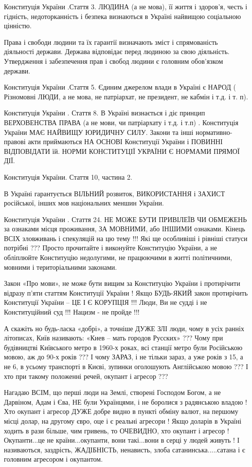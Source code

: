 \begin{itemize}
\begin{itemize}
Конституція України .Стаття 3. ЛЮДИНА (а не мова), її життя і здоров'я, честь і
гідність, недоторканність і безпека визнаються в Україні найвищою соціальною
цінністю.

Права і свободи людини та їх гарантії визначають зміст і спрямованість
діяльності держави. Держава відповідає перед людиною за свою діяльність.
Утвердження і забезпечення прав і свобод людини є головним обов'язком держави.

Конституція України .Стаття 5. Єдиним джерелом влади в Україні є НАРОД (
Різномовні ЛЮДИ, а не мова, не патріархат, не президент, не кабмін і т.д. і т.
п).

Конституція України . Стаття 8. В Україні визнається і діє принцип ВЕРХОВЕНСТВА
ПРАВА (а не мови, чи патріархату і т.д. і т.п) . Конституція України МАЄ
НАЙВИЩУ ЮРИДИЧНУ СИЛУ. Закони та інші нормативно-правові акти приймаються НА
ОСНОВІ Конституції України і ПОВИННІ ВІДПОВІДАТИ їй. НОРМИ КОНСТИТУЦІЇ УКРАЇНИ
Є НОРМАМИ ПРЯМОЇ ДІЇ.

Конституція України. Стаття 10, частина 2.

В Україні гарантується ВІЛЬНИЙ розвиток, ВИКОРИСТАННЯ і ЗАХИСТ російської,
інших мов національних меншин України.

Конституція України . Стаття 24. НЕ МОЖЕ БУТИ ПРИВІЛЕЇВ ЧИ ОБМЕЖЕНЬ за ознаками
місця проживання, ЗА МОВНИМИ, або ІНШИМИ ознаками. Кінець ВСІХ зловживань і
спекуляцій на цю тему !!! Які ще особливіші і рівніші статуси потрібні ???
Просто прочитайте і виконуйте Конституцію України, а не обліплюйте Конституцію
недолугими, не працюючими в житті політичними, мовними і територіальними
законами.

Закон «Про мови», не може бути вищим за Конституцію України і протирічити
відразу п’яти статтям Конституції України ! Якщо БУДЬ-ЯКИЙ закон протирічить
Конституції України – ЦЕ І Є КОРУПЦІЯ !!! Люди, Ви не судді і не Конституційний
суд !!! Нацизм - не пройде !!!

А скажіть но будь-ласка «добрі», а точніше ДУЖЕ ЗЛІ люди, чому в усіх ранніх
літописах, Київ називають: «Киев – мать городов Русских» ??? Чому при
будівництві Київського метро в 1960-х роках, всі станції метро були Російською
мовою, аж до 90-х років ??? І чому ЗАРАЗ, і не тільки зараз, а уже років з 15,
а не 6, в усьому транспорті в Києві, зупинки оголошують Англійською мовою ??? І
хто при такому положенні речей, окупант і агресор ??? 


Нагадаю ВСІМ, що перші люди на Землі, створені Господом Богом, а не Дарвіном,
Адам і Єва, НЕ були Українцями, і не боролися з радянською владою ! Хто окупант
і агресор ДУЖЕ добре видно в пункті обміну валют, на першому місці долар, на
другому євро, оце і є реальні агресори ! Якщо доларів в Україні ходить в рази
більше, чим гривень, то ОЧЕВИДНО, хто окупант і агресор ! Окупанти...це не
країни...окупанти, вони такі...вони в серці у людей живуть ! І називаються,
заздрість, ЖАДІБНІСТЬ, ненависть, злоба сатанинська.....сатана і є головним
агресором і окупантом. 


\end{itemize}
\end{itemize}
